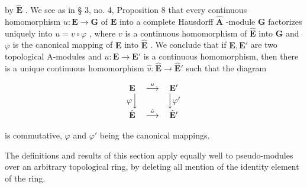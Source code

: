 by \(\hat{\mathbf{E}}\) . We see as in § 3, no. 4, Proposition 8 that every continuous homomorphism \(u: \mathbf{E} \to \mathbf{G}\) of \(\mathbf{E}\) into a complete Hausdorff \(\hat{\mathbf{A}}\) -module \(\mathbf{G}\) factorizes uniquely into \(u = v \circ \varphi\) , where \(v\) is a continuous homomorphism of \(\hat{\mathbf{E}}\) into \(\mathbf{G}\) and \(\varphi\) is the canonical mapping of \(\mathbf{E}\) into \(\hat{\mathbf{E}}\) . We conclude that if \(\mathbf{E}, \mathbf{E}'\) are two topological A-modules and \(u: \mathbf{E} \to \mathbf{E}'\) is a continuous homomorphism, then there is a unique continuous homomorphism \(\hat{u}: \hat{\mathbf{E}} \to \hat{\mathbf{E}}'\) such that the diagram

\[
\begin{array}{c c c} \mathbf {E} & \stackrel {{u}} {{\longrightarrow}} & \mathbf {E} ^ {\prime} \\ \varphi \Big \downarrow & & \Big \downarrow \varphi^ {\prime} \\ \hat {\mathbf {E}} & \stackrel {{\hat {u}}} {{\longrightarrow}} & \hat {\mathbf {E}} ^ {\prime} \end{array}
\]

is commutative, \(\varphi\) and \(\varphi'\) being the canonical mappings.

The definitions and results of this section apply equally well to pseudo-modules over an arbitrary topological ring, by deleting all mention of the identity element of the ring.


